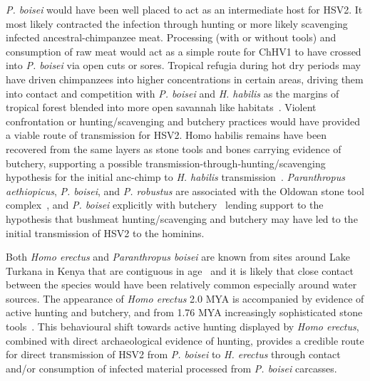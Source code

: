 \documentclass[fleqn,10pt]{wlscirep}
\begin{document}
\textit{P. boisei} would have been well placed to act as an intermediate host for HSV2. It most likely contracted the infection through hunting or more likely scavenging infected ancestral-chimpanzee meat. Processing (with or without tools) and consumption of raw meat would act as a simple route for ChHV1 to have crossed into \textit{P. boisei} via open cuts or sores. Tropical refugia during hot dry periods may have driven chimpanzees into higher concentrations in certain areas, driving them into contact and competition with \textit{P. boisei} and \textit{H. habilis} as the margins of tropical forest blended into more open savannah like habitats~\citep{Julier2017}. Violent confrontation or hunting/scavenging and butchery practices would have provided a viable route of transmission for HSV2. Homo habilis remains have been recovered from the same layers as stone tools and bones carrying evidence of butchery, supporting a possible transmission-through-hunting/scavenging hypothesis for the initial anc-chimp to \textit{H. habilis} transmission~\citep{Clarke2012}. \textit{Paranthropus aethiopicus}, \textit{P. boisei}, and \textit{P. robustus} are associated with the Oldowan stone tool complex~\citep{DeHeinzelin1999}, and \textit{P. boisei} explicitly with butchery~\citep{Dominguez-Rodrigo2013} lending support to the hypothesis that bushmeat hunting/scavenging and butchery may have led to the initial transmission of HSV2 to the hominins. 

Both \textit{Homo erectus} and \textit{Paranthropus boisei} are known from sites around Lake Turkana in Kenya that are contiguous in age~\citep{Anton2016, Wood2007} and it is likely that close contact between the species would have been relatively common especially around water sources. The appearance of \textit{Homo erectus} 2.0 MYA is accompanied by evidence of active hunting and butchery, and from 1.76 MYA increasingly sophisticated stone tools~\citep{Cachel1998}. This behavioural shift towards active hunting displayed by \textit{Homo erectus}, combined with direct archaeological evidence of hunting, provides a credible route for direct  transmission of HSV2 from \textit{P. boisei} to \textit{H. erectus} through contact and/or consumption of infected material processed from \textit{P. boisei} carcasses.
\end{document}
